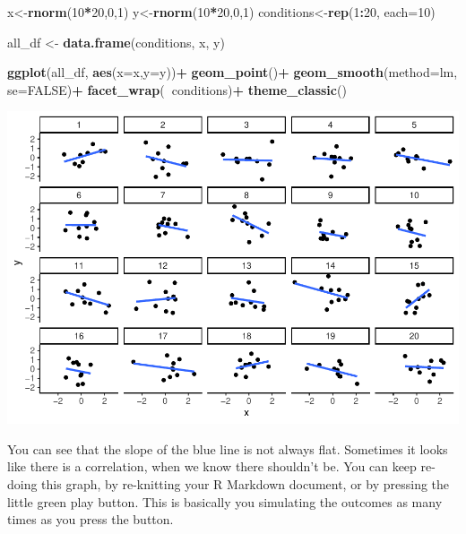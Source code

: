 \documentclass[]{book}
\newenvironment{Shaded}{\begin{snugshade}}{\end{snugshade}}
\newcommand{\KeywordTok}[1]{\textcolor[rgb]{0.13,0.29,0.53}{\textbf{#1}}}
\newcommand{\DataTypeTok}[1]{\textcolor[rgb]{0.13,0.29,0.53}{#1}}
\newcommand{\DecValTok}[1]{\textcolor[rgb]{0.00,0.00,0.81}{#1}}
\newcommand{\StringTok}[1]{\textcolor[rgb]{0.31,0.60,0.02}{#1}}
\newcommand{\OtherTok}[1]{\textcolor[rgb]{0.56,0.35,0.01}{#1}}
\newcommand{\OperatorTok}[1]{\textcolor[rgb]{0.81,0.36,0.00}{\textbf{#1}}}
\newcommand{\NormalTok}[1]{#1}
\begin{document}
\begin{Shaded}
\begin{Highlighting}[]
\NormalTok{x<-}\KeywordTok{rnorm}\NormalTok{(}\DecValTok{10}\OperatorTok{*}\DecValTok{20}\NormalTok{,}\DecValTok{0}\NormalTok{,}\DecValTok{1}\NormalTok{)}
\NormalTok{y<-}\KeywordTok{rnorm}\NormalTok{(}\DecValTok{10}\OperatorTok{*}\DecValTok{20}\NormalTok{,}\DecValTok{0}\NormalTok{,}\DecValTok{1}\NormalTok{)}
\NormalTok{conditions<-}\KeywordTok{rep}\NormalTok{(}\DecValTok{1}\OperatorTok{:}\DecValTok{20}\NormalTok{, }\DataTypeTok{each=}\DecValTok{10}\NormalTok{)}

\NormalTok{all_df <-}\StringTok{ }\KeywordTok{data.frame}\NormalTok{(conditions, x, y)}

\KeywordTok{ggplot}\NormalTok{(all_df, }\KeywordTok{aes}\NormalTok{(}\DataTypeTok{x=}\NormalTok{x,}\DataTypeTok{y=}\NormalTok{y))}\OperatorTok{+}
\StringTok{  }\KeywordTok{geom_point}\NormalTok{()}\OperatorTok{+}
\StringTok{  }\KeywordTok{geom_smooth}\NormalTok{(}\DataTypeTok{method=}\NormalTok{lm, }\DataTypeTok{se=}\OtherTok{FALSE}\NormalTok{)}\OperatorTok{+}
\StringTok{  }\KeywordTok{facet_wrap}\NormalTok{(}\OperatorTok{~}\NormalTok{conditions)}\OperatorTok{+}
\StringTok{  }\KeywordTok{theme_classic}\NormalTok{()}
\end{Highlighting}
\end{Shaded}

\includegraphics{Statistics_Lab_files/figure-latex/unnamed-chunk-68-1.pdf}

You can see that the slope of the blue line is not always flat.
Sometimes it looks like there is a correlation, when we know there
shouldn't be. You can keep re-doing this graph, by re-knitting your R
Markdown document, or by pressing the little green play button. This is
basically you simulating the outcomes as many times as you press the
button.
\end{document}
